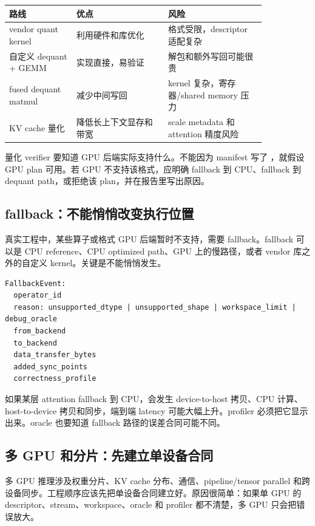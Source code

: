 \begin{center}
\begin{tabular}{p{0.22\linewidth}p{0.30\linewidth}p{0.32\linewidth}}
\toprule
路线 & 优点 & 风险 \\
\midrule
vendor quant kernel & 利用硬件和库优化 & 格式受限，descriptor 适配复杂 \\
自定义 dequant + GEMM & 实现直接，易验证 & 解包和额外写回可能很贵 \\
fused dequant matmul & 减少中间写回 & kernel 复杂，寄存器/shared memory 压力 \\
KV cache 量化 & 降低长上下文显存和带宽 & scale metadata 和 attention 精度风险 \\
\bottomrule
\end{tabular}
\end{center}

量化 verifier 要知道 GPU 后端实际支持什么。不能因为 manifest 写了 ，就假设 GPU plan 可用。若 GPU 不支持该格式，应明确 fallback 到 CPU、fallback 到 dequant path，或拒绝该 plan，并在报告里写出原因。

\subsection{fallback：不能悄悄改变执行位置}

真实工程中，某些算子或格式 GPU 后端暂时不支持，需要 fallback。fallback 可以是 CPU reference、CPU optimized path、GPU 上的慢路径，或者 vendor 库之外的自定义 kernel。关键是不能悄悄发生。

\begin{lstlisting}[numbers=none,caption={fallback report 字段}]
FallbackEvent:
  operator_id
  reason: unsupported_dtype | unsupported_shape | workspace_limit | debug_oracle
  from_backend
  to_backend
  data_transfer_bytes
  added_sync_points
  correctness_profile
\end{lstlisting}

如果某层 attention fallback 到 CPU，会发生 device-to-host 拷贝、CPU 计算、host-to-device 拷贝和同步，端到端 latency 可能大幅上升。profiler 必须把它显示出来。oracle 也要知道 fallback 路径的误差合同可能不同。

\subsection{多 GPU 和分片：先建立单设备合同}

多 GPU 推理涉及权重分片、KV cache 分布、通信、pipeline/tensor parallel 和跨设备同步。工程顺序应该先把单设备合同建立好。原因很简单：如果单 GPU 的 descriptor、stream、workspace、oracle 和 profiler 都不清楚，多 GPU 只会把错误放大。

